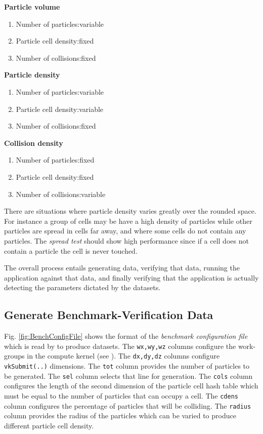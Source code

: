 \textbf{Particle volume}
\begin{enumerate}
\item Number of particles:variable
\item Particle cell density:fixed
\item Number of collisions:fixed
\end{enumerate}

\textbf{Particle density}
\begin{enumerate}
\item Number of particles:variable
\item Particle cell density:variable
\item Number of collisions:fixed
\end{enumerate}

\textbf{Collision density}
\begin{enumerate}
\item Number of particles:fixed
\item Particle cell density:fixed
\item Number of collisions:variable
\end{enumerate}

There are situations where particle density varies greatly over the rounded space. For instance a group of cells may be have a high density of particles while other particles are spread in cells far away, and where some cells do not contain any particles. The \textit{spread test} should show high performance since if a cell does not contain a particle the cell is never touched. 

The overall process entails generating data, verifying that data, running the application against that data, and finally verifying that the application is actually detecting the parameters dictated by the datasets.

\subsection{Generate Benchmark-Verification Data}




Fig. \ref{fig:BenchConfigFile} shows the format of the \textit{benchmark configuration file} which is read by \gen{} to produce datasets. The \texttt{wx,wy,wz} columns configure the work-groups in the compute kernel (see ).  The \texttt{dx,dy,dz} columns configure \texttt{vkSubmit(..)} dimensions. The \texttt{tot} column provides the number of particles to be generated. The \texttt{sel} column selects that line for generation. The \texttt{cols} column configures the length of the second dimension of the particle cell hash table which must be equal to the number of particles that can occupy a cell.  The \texttt{cdens} column configures the percentage of particles that will be colliding. The \texttt{radius} column provides the radius of the particles which can be varied to produce different particle cell density. 

